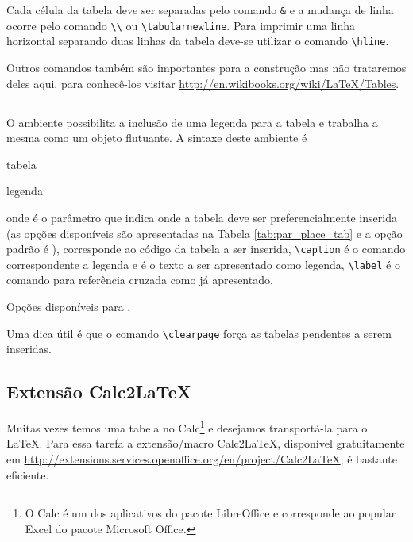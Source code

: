 Cada célula da tabela deve ser separadas pelo comando
\lstinline!&! e a mudança de linha ocorre pelo
comando \lstinline!\\! ou
\lstinline!\tabularnewline!.
Para imprimir uma linha horizontal separando duas linhas da tabela deve-se
utilizar o comando \lstinline!\hline!.\\

Outros comandos também são importantes para a construção mas não trataremos
deles aqui, para conhecê-los visitar
\url{http://en.wikibooks.org/wiki/LaTeX/Tables}.

\subsection{}
O ambiente  possibilita a
inclusão de uma legenda para a tabela e trabalha a mesma como um objeto
flutuante. A sintaxe deste ambiente é
\begin{code}
  \begin{table}[posicao]
    tabela
    \caption{legenda}
    \label{P:tebela}
  \end{table}
\end{code}
onde  é o parâmetro que indica onde a tabela deve ser
preferencialmente inserida (as opções disponíveis são apresentadas na Tabela
\ref{tab:par_place_tab} e a opção padrão é ), 
corresponde ao código da tabela a ser inserida,
\lstinline!\caption! é o comando
correspondente a legenda e  é o texto a ser apresentado como
legenda, \lstinline!\label! é o comando para referência cruzada como já
apresentado. \\
\begin{table}[!htb]
  \centering
  \caption{Opções disponíveis para .}
  \label{tab:par_place_tab}
  
\end{table}

Uma dica útil é que o comando
\lstinline!\clearpage! força as
tabelas pendentes a serem inseridas.

\subsection{Extensão Calc2LaTeX}
Muitas vezes temos uma tabela no Calc\footnote{O Calc é um dos aplicativos do
pacote LibreOffice e corresponde ao popular Excel do pacote Microsoft Office.} e
desejamos transportá-la para o LaTeX. Para essa tarefa a extensão/macro
Calc2LaTeX, disponível gratuitamente em
\url{http://extensions.services.openoffice.org/en/project/Calc2LaTeX}, é
bastante eficiente.

